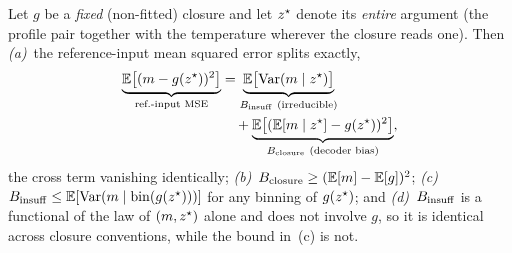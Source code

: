 \begin{lemma}\label{prop:decomp}
Let $g$ be a \emph{fixed} (non-fitted) closure and let $z^\star$ denote its \emph{entire}
argument (the profile pair together with the temperature wherever the closure reads one). Then
\emph{(a)}~the reference-input mean squared error splits exactly,
\begin{equation}
\begin{aligned}
  \underbrace{\Ex\big[(m-g(\zstar))^2\big]}_{\text{ref.-input MSE}}
  &= \underbrace{\Ex\big[\Var(m\mid \zstar)\big]}_{\Binsuf\ (\text{irreducible})} \\
  &\quad + \underbrace{\Ex\big[(\Ex[m\mid\zstar]-g(\zstar))^2\big]}_{\Bclos\ (\text{decoder bias})} ,
\end{aligned}
  \label{eq:decomp}
\end{equation}
the cross term vanishing identically; \emph{(b)}~$B_{\mathrm{closure}}\ge(\mathbb{E}[m]-\mathbb{E}[g])^2$;
\emph{(c)}~$B_{\mathrm{insuff}}\le\mathbb{E}[\mathrm{Var}(m\mid\mathrm{bin}(g(z^\star)))]$ for any binning of $g(z^\star)$; and
\emph{(d)}~$B_{\mathrm{insuff}}$ is a functional of the law of $(m,z^\star)$ alone and does not involve $g$, so
it is identical across closure conventions, while the bound in~(c) is not.
\end{lemma}

